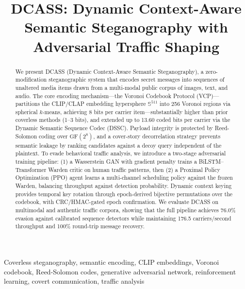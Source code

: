 \documentclass[conference]{IEEEtran}
\begin{document}
\title{DCASS: Dynamic Context-Aware Semantic Steganography with Adversarial Traffic Shaping}

\author{
}

\maketitle

\begin{abstract}
We present DCASS (Dynamic Context-Aware Semantic Steganography), a zero-modification steganographic system that encodes secret messages into sequences of unaltered media items drawn from a multi-modal public corpus of images, text, and audio. The core encoding mechanism---the Voronoi Codebook Protocol (VCP)---partitions the CLIP/CLAP embedding hypersphere $\mathbb{S}^{511}$ into 256 Voronoi regions via spherical $k$-means, achieving 8 bits per carrier item---substantially higher than prior coverless methods (1--3 bits), and extended up to 13.60 coded bits per carrier via the Dynamic Semantic Sequence Codec (DSSC). Payload integrity is protected by Reed-Solomon coding over $\text{GF}(2^8)$, and a cover-story decorrelation strategy prevents semantic leakage by ranking candidates against a decoy query independent of the plaintext. To evade behavioral traffic analysis, we introduce a two-stage adversarial training pipeline: (1) a Wasserstein GAN with gradient penalty trains a BiLSTM--Transformer Warden critic on human traffic patterns, then (2) a Proximal Policy Optimization (PPO) agent learns a multi-channel scheduling policy against the frozen Warden, balancing throughput against detection probability. Dynamic context keying provides temporal key rotation through epoch-derived bijective permutations over the codebook, with CRC/HMAC-gated epoch confirmation. We evaluate DCASS on multimodal and authentic traffic corpora, showing that the full pipeline achieves 76.0\% evasion against calibrated sequence detectors while maintaining 176.5 carriers/second throughput and 100\% round-trip message recovery.
\end{abstract}

\begin{IEEEkeywords}
Coverless steganography, semantic encoding, CLIP embeddings, Voronoi codebook, Reed-Solomon codes, generative adversarial network, reinforcement learning, covert communication, traffic analysis
\end{IEEEkeywords}
\end{document}
